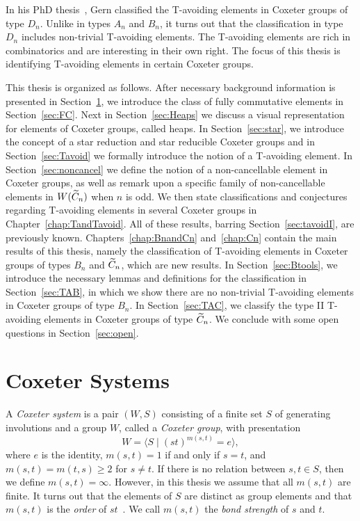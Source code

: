 In his PhD thesis~\cite{Gern2013a}, Gern classified the T-avoiding elements in Coxeter groups of type $D_n$. Unlike in types $A_n$ and $B_n$, it turns out that the classification in type $D_n$ includes non-trivial T-avoiding elements. The T-avoiding elements are rich in combinatorics and are interesting in their own right. The focus of this thesis is identifying T-avoiding elements in certain Coxeter groups.

This thesis is organized as follows. After necessary background information is presented in Section~\ref{sec:coxeter}, we introduce the class of fully commutative elements in Section~\ref{sec:FC}. Next in Section~\ref{sec:Heaps} we discuss a visual representation for elements of Coxeter groups, called heaps. In Section~\ref{sec:star}, we introduce the concept of a star reduction and star reducible Coxeter groups and in Section~\ref{sec:Tavoid} we formally introduce the notion of a T-avoiding element. In Section~\ref{sec:noncancel} we define the notion of a non-cancellable element in Coxeter groups, as well as remark upon a specific family of non-cancellable elements in $W(\widetilde{C}_n)$ when $n$ is odd. We then state classifications and conjectures regarding T-avoiding elements in several Coxeter groups in Chapter~\ref{chap:TandTavoid}. All of these results, barring Section~\ref{sec:tavoidI}, are previously known. Chapters~\ref{chap:BnandCn} and~\ref{chap:Cn} contain the main results of this thesis, namely the classification of T-avoiding elements in Coxeter groups of types $B_n$ and $\widetilde{C}_n$, which are new results. In Section~\ref{sec:Btools}, we introduce the necessary lemmas and definitions for the classification in Section~\ref{sec:TAB}, in which we show there are no non-trivial T-avoiding elements in Coxeter groups of type $B_n$. In Section~\ref{sec:TAC}, we classify the type II T-avoiding elements in Coxeter groups of type $\widetilde{C}_n$. We conclude with some open questions in Section~\ref{sec:open}.



\section{Coxeter Systems}\label{sec:coxeter}

A \emph{Coxeter system} is a pair $(W,S)$ consisting of a finite set $S$ of generating involutions and a group $W$, called a \emph{Coxeter group}, with presentation 
\[ 
W = \langle S \mid (st)^{m(s, t)} = e  \rangle,
\]
where $e$ is the identity, $m(s,t) = 1$ if and only if $s = t$, and $m(s,t) = m(t,s) \geq 2$ for $s \neq t$. If there is no relation between $s,t \in S$, then we define $m(s,t)=\infty$. However, in this thesis we assume that all $m(s,t)$ are finite. It turns out that the elements of $S$ are distinct as group elements and that $m(s,t)$ is the \emph\emph{order} of $st$~\cite{Humphreys1990}. We call $m(s,t)$ the \emph{bond strength} of $s$ and $t$.\\

